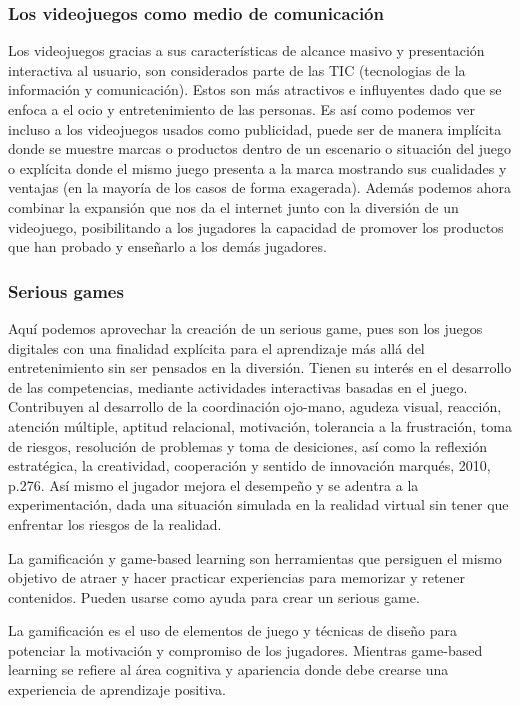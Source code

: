 \subsubsection{Los videojuegos como medio de comunicación}
Los videojuegos gracias a sus características de alcance masivo y presentación interactiva al usuario, son considerados parte de las TIC (tecnologias de la información y comunicación). Estos son más atractivos e influyentes dado que se enfoca a el ocio y entretenimiento de las personas. 
Es así como podemos ver incluso a los videojuegos usados como publicidad, puede ser de manera implícita donde se muestre marcas o productos dentro de un escenario o situación del juego o explícita donde el mismo juego presenta a la marca mostrando sus cualidades y ventajas (en la mayoría de los casos de forma exagerada). Además podemos ahora combinar la expansión que nos da el internet junto con la diversión de un videojuego, posibilitando a los jugadores la capacidad de promover los productos que han probado y enseñarlo a los demás jugadores.


\subsubsection{Serious games}
Aquí podemos aprovechar la creación de un serious game, pues son los juegos digitales con una finalidad explícita para el aprendizaje más allá del entretenimiento sin ser pensados en la diversión. Tienen su interés en el desarrollo de las competencias, mediante actividades interactivas basadas en el juego.
Contribuyen al desarrollo de la coordinación ojo-mano, agudeza visual, reacción, atención múltiple, aptitud relacional, motivación, tolerancia a la frustración, toma de riesgos, resolución de problemas y toma de desiciones, así como la reflexión estratégica, la creatividad, cooperación y sentido de innovación {marqués, 2010, p.276}. Así mismo el jugador mejora el desempeño y se adentra a la experimentación, dada una situación simulada en la realidad virtual sin tener que enfrentar los riesgos de la realidad. 

La gamificación y game-based learning son herramientas que persiguen el mismo objetivo de atraer y hacer practicar experiencias para memorizar y retener contenidos. Pueden usarse como ayuda para crear un serious game.

La gamificación es el uso de elementos de juego y técnicas de diseño para potenciar la motivación y compromiso de los jugadores. Mientras game-based learning se refiere al área cognitiva y apariencia donde debe crearse una experiencia de aprendizaje positiva.

